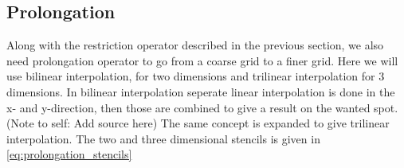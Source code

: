                 \subsection{Prolongation}
                    \label{sec:prol_simple}

                    Along with the restriction operator described in the previous section, we also need prolongation
                    operator to go from a coarse grid to a finer grid.	Here we will use bilinear interpolation, for
                    two dimensions and trilinear interpolation for 3 dimensions. In bilinear interpolation seperate
                    linear interpolation is done in the x- and y-direction, then those are combined to give a result
                    on the wanted spot. (Note to self: Add source here) The same concept is expanded to give trilinear
                    interpolation. The two and three dimensional stencils is given in \eqref{eq:prolongation_stencils}


